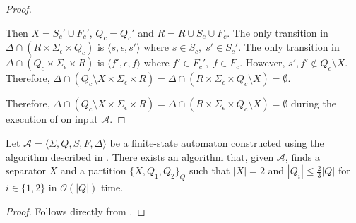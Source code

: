 \begin{proof}
  \begin{case}
    Then $X = S_c' \cup F_c'$, $Q_c = Q_c'$ and $R = R \cup S_c \cup
      F_c$. The only transition in $\Delta \cap (R \times \Sigma_\epsilon
      \times Q_c)$ is $\langle s, \epsilon, s' \rangle$ where $s \in S_c,
      \; s' \in S_c'$. The only transition in $\Delta \cap (Q_c \times
      \Sigma_\epsilon \times R)$ is $\langle f', \epsilon, f \rangle$
    where $f' \in F_c', \; f \in F_c$. However, $s', f' \not\in Q_c
      \setminus X$. Therefore, $\Delta \cap (Q_c \setminus X \times
      \Sigma_\epsilon \times R) = \Delta \cap (R \times \Sigma_\epsilon
      \times Q_c \setminus X) = \emptyset$.
  \end{case}

  \noindent
  Therefore, $\Delta \cap (Q_c \setminus X \times \Sigma_\epsilon \times R) =
    \Delta \cap (R \times \Sigma_\epsilon \times Q_c \setminus X) = \emptyset$
  during the execution of  on input
  $\mathcal{A}$.
\end{proof}

\begin{theorem}
  Let $\mathcal{A} = \langle \Sigma, Q, S, F, \Delta \rangle$ be a finite-state
  automaton constructed using the algorithm described in .
  There exists an algorithm that, given $\mathcal{A}$, finds a separator $X$ and a
  partition $\{ X, Q_1, Q_2 \}_Q$ such that $|X| = 2$ and $|Q_i| \leq \frac{2}{3}
  |Q|$ for $i \in \{ 1, 2 \}$ in $\mathcal{O}(|Q|)$ time.
\end{theorem}

\begin{proof}
  Follows directly from .
\end{proof}
